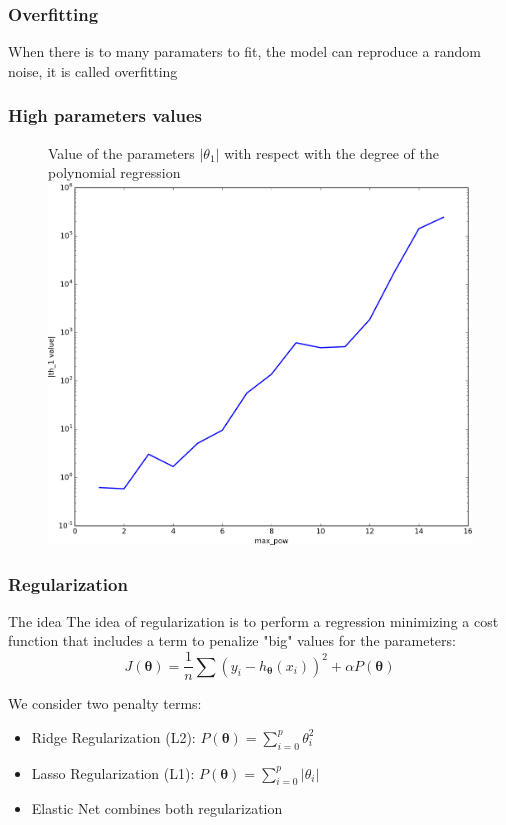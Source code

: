 \documentclass[handout]{beamer}
\begin{document}
\begin{frame}
\frametitle{Overfitting}
\begin{block}{}
When there is to many paramaters to fit, the model can reproduce 
a random noise, it is called \alert{overfitting}
\end{block}
\pause
\begin{table}
\resizebox{\textwidth}{!}{%
}
\end{table}
\end{frame}


\begin{frame}
\frametitle{High parameters values}
\begin{figure}
Value of the parameters $|\theta_1|$ with respect with the degree of the polynomial
regression\\
\includegraphics[height=0.75\textheight]{./fig/L1/coefs_th1.png}
\end{figure}

\end{frame}

\begin{frame}
\frametitle{Regularization}
\begin{block}{The idea}
The idea of regularization is to perform a regression minimizing a cost function
that includes a term to penalize "big" values for the parameters:
$$
J(\bm{\theta}) = \frac{1}{n} \sum (y_i - h_{\bm{\theta}}(x_i))^2 + \alpha P(\bm{\theta})
$$
\end{block}
\pause
We consider two penalty terms:
\begin{itemize}[<+->]
\item \alert{Ridge Regularization (L2):} $P(\bm{\theta}) = \sum_{i=0}^p \theta_i^2$
\item \alert{Lasso Regularization (L1):} $P(\bm{\theta}) = \sum_{i=0}^p |\theta_i|$
\item Elastic Net combines both regularization
\end{itemize}

\end{frame}
\end{document}
